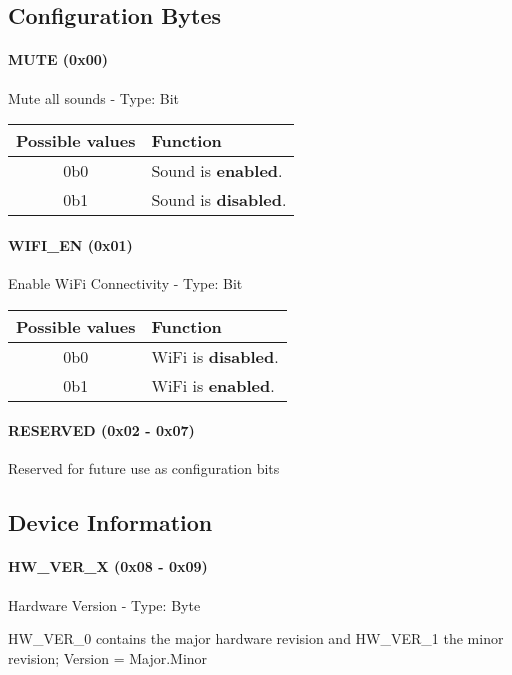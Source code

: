 \documentclass[11pt, a4paper]{article}
\begin{document}
\subsection*{Configuration Bytes}
\begin{minipage}{0.5\textwidth}
	\paragraph{MUTE (0x00)} Mute all sounds - Type: Bit
	
	\vspace{0.2cm}\hspace{0.5cm}\begin{tabular}{c|l}
		Possible values & Function \\
		\hline
		0b0 & Sound is \textbf{enabled}.\\
		0b1 & Sound is \textbf{disabled}.
	\end{tabular}
\end{minipage}
\begin{minipage}{0.5\textwidth}
	\paragraph{WIFI\_EN (0x01)} Enable WiFi Connectivity - Type: Bit
	
	\vspace{0.2cm}\hspace{0.5cm}\begin{tabular}{c|l}
		Possible values & Function \\
		\hline
		0b0 & WiFi is \textbf{disabled}.\\
		0b1 & WiFi is \textbf{enabled}.
	\end{tabular}
\end{minipage}

\paragraph{RESERVED (0x02 - 0x07)} Reserved for future use as configuration bits

\subsection*{Device Information}
\paragraph{HW\_VER\_X (0x08 - 0x09)} Hardware Version - Type: Byte

HW\_VER\_0 contains the major hardware revision and HW\_VER\_1 the minor revision; Version = Major.Minor
\end{document}
